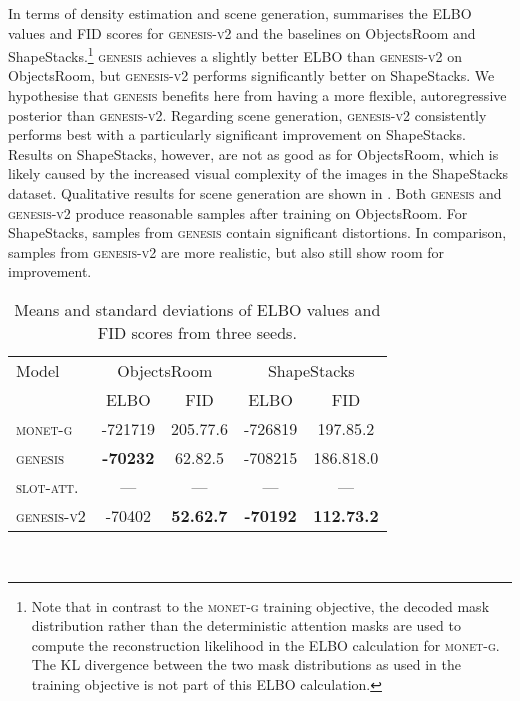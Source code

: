\documentclass{article}
\begin{document}
In terms of density estimation and scene generation,  summarises the ELBO values and FID scores for \textsc{genesis-v2} and the baselines on ObjectsRoom and ShapeStacks.\footnote{Note that in contrast to the \textsc{monet-g} training objective, the decoded mask distribution rather than the deterministic attention masks are used to compute the reconstruction likelihood in the ELBO calculation for \textsc{monet-g}. The KL divergence between the two mask distributions as used in the training objective is not part of this ELBO calculation.}
\textsc{genesis} achieves a slightly better ELBO than \textsc{genesis-v2} on ObjectsRoom, but \textsc{genesis-v2} performs significantly better on ShapeStacks.
We hypothesise that \textsc{genesis} benefits here from having a more flexible, autoregressive posterior than \textsc{genesis-v2}.
Regarding scene generation, \textsc{genesis-v2} consistently performs best with a particularly significant improvement on ShapeStacks.
Results on ShapeStacks, however, are not as good as for ObjectsRoom, which is likely caused by the increased visual complexity of the images in the ShapeStacks dataset.
Qualitative results for scene generation are shown in .
Both \textsc{genesis} and \textsc{genesis-v2} produce reasonable samples after training on ObjectsRoom.
For ShapeStacks, samples from \textsc{genesis} contain significant distortions.
In comparison, samples from \textsc{genesis-v2} are more realistic, but also still show room for improvement.

\begin{table}
    \centering
	\caption{Means and standard deviations of ELBO values and FID scores from three seeds.}
	\begin{tabular}{lcccc}
		\toprule
		Model & \multicolumn{2}{c}{ObjectsRoom} & \multicolumn{2}{c}{ShapeStacks} \\
		\cmidrule(r){2-3} \cmidrule(l){4-5}
		& ELBO  & FID  & ELBO  & FID  \\
		\midrule
		\textsc{monet-g}    & -721719 & 205.77.6         & -726819 & 197.85.2  \\
		\textsc{genesis}    & \textbf{-70232} & 62.82.5          & -708215 & 186.818.0 \\
		\textsc{slot-att.}  & --- & --- & --- & --- \\
		\textsc{genesis-v2} & -70402 & \textbf{52.62.7} & \textbf{-70192} & \textbf{112.73.2} \\
		\bottomrule
	\end{tabular}
	\label{tab:gpp:generation}
	\\
\end{table}
\end{document}
